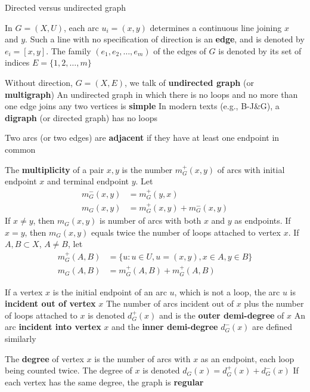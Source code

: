 \documentclass[aspectratio=43]{beamer}
\begin{document}
\begin{frame}{Directed versus undirected graph}
\begin{definition}[Edge]
In $G=(X,U)$, each arc $u_i=(x,y)$ determines a continuous line
joining $x$ and $y$. Such a line with no specification of direction is an \textbf{edge}, and is denoted by $e_i=[x,y]$.
The family $(e_1,e_2,\ldots,e_m)$ of the edges of $G$ is denoted by its set of indices $E=\{1,2,\ldots,m\}$
\end{definition}
\vfill
Without direction, $G=(X,E)$, we talk of \textbf{undirected graph} (or \textbf{multigraph})
\vfill
An undirected graph in which there is no loops and no more than one edge joins any two vertices is \textbf{simple}
\vfill
In modern texts (e.g., B-J\&G), a \textbf{digraph} (or directed graph) has no loops
\end{frame}


\begin{frame}
\begin{definition}
Two arcs (or two edges) are \textbf{adjacent} if they have at least one endpoint in common
\end{definition}

\begin{definition}
The \textbf{multiplicity} of a pair $x,y$ is the number $m_G^+(x,y)$ of arcs with initial endpoint $x$ and terminal endpoint $y$. Let
\begin{align*}
m_G^-(x,y) &= m_G^+(y,x) \\
m_G(x,y) &= m_G^+(x,y)+m_G^-(x,y)
\end{align*}
If $x\neq y$, then $m_G(x,y)$ is number of arcs with both $x$ and $y$ as endpoints. If $x=y$, then $m_G(x,y)$ equals twice the number of loops attached to vertex $x$. If $A,B\subset X$, $A\neq B$, let
\begin{align*}
m_G^+(A,B) &= \{u:u\in U, u=(x,y),x\in A,y\in B\} \\
m_G(A,B) &= m_G^+(A,B)+m_G^+(A,B)
\end{align*}
\end{definition}
\end{frame}


\begin{frame}
\begin{definition}
If a vertex $x$ is the initial endpoint of an arc $u$, which is not a loop, the arc $u$ is \textbf{incident out of vertex} $x$ 
\vskip0.2cm
The number of arcs incident out of $x$ plus the number of loops attached to $x$ is denoted $d_G^+(x)$ and is the \textbf{outer demi-degree} of $x$
\vskip0.2cm
An arc \textbf{incident into vertex} $x$ and the \textbf{inner demi-degree} $d_G^-(x)$ are defined similarly
\end{definition}
\vfill
\begin{definition}[Degree]
The \textbf{degree} of vertex $x$ is the number of arcs with $x$ as an endpoint, each loop being counted twice. The degree of $x$ is denoted $d_G(x)=d_G^+(x)+d_G^-(x)$
\vskip0.2cm
If each vertex has the same degree, the graph is \textbf{regular}
\end{definition}
\end{frame}
\end{document}
